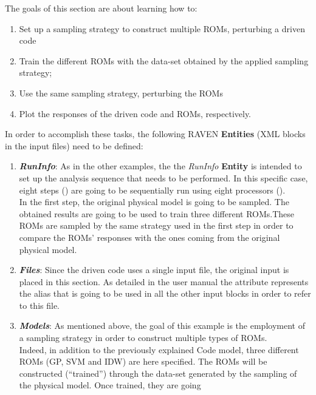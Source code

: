 The goals of this section are about learning how to:
 \begin{enumerate}
   \item Set up a sampling strategy to construct multiple ROMs, perturbing a driven code
   \item Train the different ROMs with the data-set obtained by the applied sampling strategy;
   \item Use the same sampling strategy, perturbing the ROMs
   \item Plot the responses of the driven code and ROMs, respectively.
\end{enumerate}
In order to accomplish these tasks, the following RAVEN \textbf{Entities} (XML blocks in the input files) need to be defined:
\begin{enumerate}
   \item \textbf{\textit{RunInfo}}:
   As in the other examples, the the \textit{RunInfo} \textbf{Entity} is intended  to set up the analysis sequence that
   needs to be performed. In this specific case, eight steps  () are going to be sequentially run
   using eight processors ().
   \\In the first step, the original physical model is going to be sampled. The obtained results are going to be used to
   train three different ROMs.These ROMs are sampled by the same strategy used in the first step in order to compare the
   ROMs' responses with the ones coming from the original physical model.
   \item \textbf{\textit{Files}}:
   Since the driven code uses a single input file, the original input is placed in this section. As detailed in the user manual
   the attribute   represents the alias that is going to be
   used in all the other input blocks in order to refer to this file.
   \item \textbf{\textit{Models}}:
 As mentioned above, the goal of this example is the employment of
 a sampling strategy in order to construct multiple types of ROMs.
 \\Indeed, in addition to the previously explained Code
 model,
 three different ROMs (GP, SVM and IDW) are here specified. The ROMs will be
 constructed (``trained'') through the data-set generated by the sampling of the physical model. Once trained, they are going

\end{enumerate}
